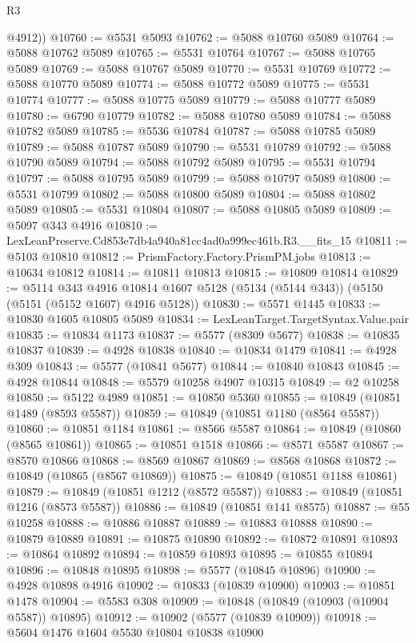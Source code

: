 \begin{lexlean}{R3}
\begin{coremodule}
        @4912))
@10760 := @5531 @5093
@10762 := @5088 @10760 @5089
@10764 := @5088 @10762 @5089
@10765 := @5531 @10764
@10767 := @5088 @10765 @5089
@10769 := @5088 @10767 @5089
@10770 := @5531 @10769
@10772 := @5088 @10770 @5089
@10774 := @5088 @10772 @5089
@10775 := @5531 @10774
@10777 := @5088 @10775 @5089
@10779 := @5088 @10777 @5089
@10780 := @6790 @10779
@10782 := @5088 @10780 @5089
@10784 := @5088 @10782 @5089
@10785 := @5536 @10784
@10787 := @5088 @10785 @5089
@10789 := @5088 @10787 @5089
@10790 := @5531 @10789
@10792 := @5088 @10790 @5089
@10794 := @5088 @10792 @5089
@10795 := @5531 @10794
@10797 := @5088 @10795 @5089
@10799 := @5088 @10797 @5089
@10800 := @5531 @10799
@10802 := @5088 @10800 @5089
@10804 := @5088 @10802 @5089
@10805 := @5531 @10804
@10807 := @5088 @10805 @5089
@10809 := @5097 @343 @4916
@10810 := LexLeanPreserve.Cd853e7db4a940a81cc4ad0a999ec461b.R3.__fits_15
@10811 := @5103 @10810
@10812 := PrismFactory.Factory.PrismPM.jobs
@10813 := @10634 @10812
@10814 := @10811 @10813
@10815 := @10809 @10814
@10829 := @5114
    @343
    @4916
    @10814
    @1607
    @5128
    (@5134 (@5144 @343))
    (@5150 (@5151 (@5152 @1607) @4916 @5128))
@10830 := @5571 @1445
@10833 := @10830 @1605 @10805 @5089
@10834 := LexLeanTarget.TargetSyntax.Value.pair
@10835 := @10834 @1173
@10837 := @5577 (@8309 @5677)
@10838 := @10835 @10837
@10839 := @4928 @10838
@10840 := @10834 @1479
@10841 := @4928 @309
@10843 := @5577 (@10841 @5677)
@10844 := @10840 @10843
@10845 := @4928 @10844
@10848 := @5579 @10258 @4907 @10315
@10849 := @2 @10258
@10850 := @5122 @4989
@10851 := @10850 @5360
@10855 := @10849 (@10851 @1489 (@8593 @5587))
@10859 := @10849 (@10851 @1180 (@8564 @5587))
@10860 := @10851 @1184
@10861 := @8566 @5587
@10864 := @10849 (@10860 (@8565 @10861))
@10865 := @10851 @1518
@10866 := @8571 @5587
@10867 := @8570 @10866
@10868 := @8569 @10867
@10869 := @8568 @10868
@10872 := @10849 (@10865 (@8567 @10869))
@10875 := @10849 (@10851 @1188 @10861)
@10879 := @10849 (@10851 @1212 (@8572 @5587))
@10883 := @10849 (@10851 @1216 (@8573 @5587))
@10886 := @10849 (@10851 @141 @8575)
@10887 := @55 @10258
@10888 := @10886 @10887
@10889 := @10883 @10888
@10890 := @10879 @10889
@10891 := @10875 @10890
@10892 := @10872 @10891
@10893 := @10864 @10892
@10894 := @10859 @10893
@10895 := @10855 @10894
@10896 := @10848 @10895
@10898 := @5577 (@10845 @10896)
@10900 := @4928 @10898 @4916
@10902 := @10833 (@10839 @10900)
@10903 := @10851 @1478
@10904 := @5583 @308
@10909 := @10848 (@10849 (@10903 (@10904 @5587)) @10895)
@10912 := @10902 (@5577 (@10839 @10909))
@10918 := @5604 @1476 @1604 @5530 @10804 @10838 @10900

\end{coremodule}
\end{lexlean}
